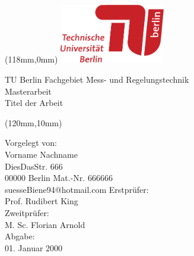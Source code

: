 \begin{titlepage}
	\begin{textblock*}{0mm}(118mm,0mm)
			\includegraphics[width=46mm]{Abbildungen/Deckblatt/TU_Logo_lang_4c_rot.pdf}  
	\end{textblock*} 

\vspace*{4cm}
    
    \begin{cmssb}
    	\begin{flushleft}
    		\vspace*{10pt} 
    		\textsf{\fontsize{14}{0}\selectfont TU Berlin Fachgebiet Mess- und Regelungstechnik}\\
			\vspace*{10pt} 
			\textsf{\fontsize{30}{0}\selectfont Masterarbeit}\\
			\vspace*{10pt}
			\textcolor{tured}{\textsf{\fontsize{14}{0}\selectfont Titel der Arbeit}}
		\end{flushleft}
	\end{cmssb}
 
\begin{textblock*}{60mm}(120mm,10mm)
    \begin{flushleft}
    	\begin{cmss}
    		\begin{normalsize}		
    			\textcolor{tugrey}{Vorgelegt von:}\\
				Vorname Nachname\\
				DiesDasStr. 666\\
				00000 Berlin \linebreak\linebreak
				Mat.-Nr. 666666\\
				suesseBiene94@hotmail.com
				\linebreak\linebreak\linebreak
				\textcolor{tugrey}{Erstprüfer:}\\
				Prof. Rudibert King\\
				\textcolor{tugrey}{Zweitprüfer:}\\
				M. Sc. Florian Arnold\\
				\textcolor{tugrey}{Abgabe:}\\
				01. Januar 2000\linebreak\linebreak
			\end{normalsize}	
		\end{cmss}
    \end{flushleft}    
\end{textblock*} 	

\end{titlepage}

\newpage

\thispagestyle{empty}
